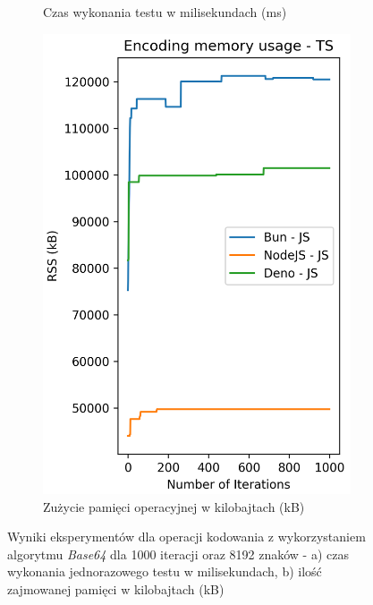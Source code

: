 \begin{figure}[H]
\begin{subfigure}[b]{0.42\textwidth}
    \caption{Czas wykonania testu w milisekundach (ms)}
    \label{fig:encoding_e2_js_time}
  \end{subfigure}
  \begin{subfigure}[b]{0.42\textwidth}
    \centering
    \includegraphics[width=\textwidth]{Figures/coding/base64_1000_encoding_js_memory.png}
    \caption{Zużycie pamięci operacyjnej w kilobajtach (kB)}
    \label{fig:encoding_e2_js_memory}
  \end{subfigure}
  \hfill
  \caption{Wyniki eksperymentów dla operacji kodowania z wykorzystaniem algorytmu \textit{Base64} dla 1000 iteracji oraz 8192 znaków - a) czas wykonania jednorazowego testu w milisekundach, b) ilość zajmowanej pamięci w kilobajtach (kB)}
  \label{fig:encoding_e2_js}
\end{figure}

